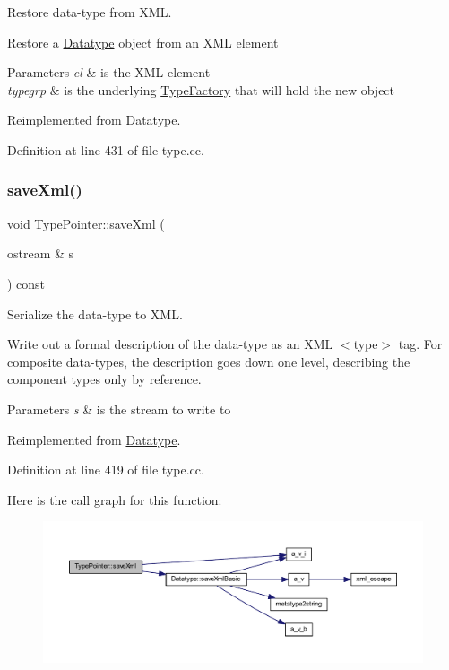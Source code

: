 Restore data-\/type from X\+ML. 

Restore a \mbox{\hyperlink{class_datatype}{Datatype}} object from an X\+ML element 
\begin{DoxyParams}{Parameters}
{\em el} & is the X\+ML element \\
\hline
{\em typegrp} & is the underlying \mbox{\hyperlink{class_type_factory}{Type\+Factory}} that will hold the new object \\
\hline
\end{DoxyParams}


Reimplemented from \mbox{\hyperlink{class_datatype_aed882ae693a31a64d56fffb9abdaa575}{Datatype}}.



Definition at line 431 of file type.\+cc.

\mbox{\label{class_type_pointer_adee39f5a617b1133d7a701cda30d154b}} 
\subsubsection{\texorpdfstring{saveXml()}{saveXml()}}
{\footnotesize\ttfamily void Type\+Pointer\+::save\+Xml (\begin{DoxyParamCaption}\item[{ostream \&}]{s }\end{DoxyParamCaption}) const\hspace{0.3cm}{\ttfamily [virtual]}}



Serialize the data-\/type to X\+ML. 

Write out a formal description of the data-\/type as an X\+ML $<$type$>$ tag. For composite data-\/types, the description goes down one level, describing the component types only by reference. 
\begin{DoxyParams}{Parameters}
{\em s} & is the stream to write to \\
\hline
\end{DoxyParams}


Reimplemented from \mbox{\hyperlink{class_datatype_a33339824f1c50d4354952296070c3902}{Datatype}}.



Definition at line 419 of file type.\+cc.

Here is the call graph for this function\+:
\nopagebreak
\begin{figure}[H]
\begin{center}
\leavevmode
\includegraphics[width=350pt]{class_type_pointer_adee39f5a617b1133d7a701cda30d154b_cgraph}
\end{center}
\end{figure}


